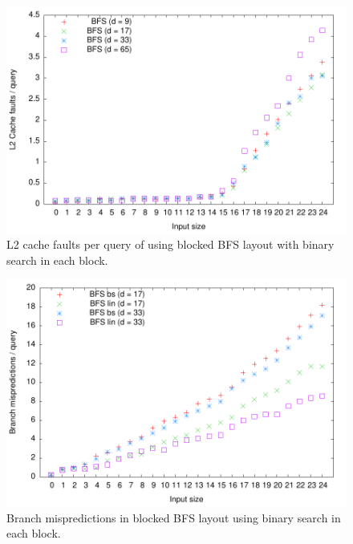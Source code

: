 \begin{figure}[h!]

  \centering
  \includegraphics[width=\textwidth]{../week1/plots/outputs/Btree_bs_cachefaults}
  \caption{L2 cache faults per query of using blocked BFS layout with binary search in each block.}
  \label{fig:blocked_bfs_bs_cachefaults}
\end{figure}

\begin{figure}[h!]

  \centering
  \includegraphics[width=\textwidth]{../week1/plots/outputs/Btree_branchmis}
  \caption{Branch mispredictions in blocked BFS layout using binary search in each block.}
  \label{fig:blocked_bfs_branchmis_runningtime}
\end{figure}

